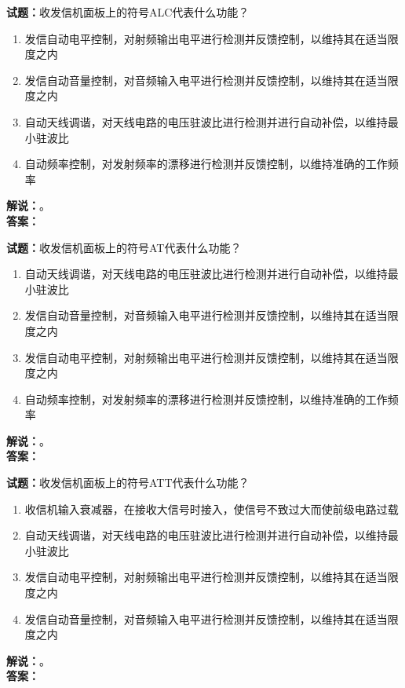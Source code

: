\documentclass{ctexbook}
\begin{document}
\bigskip




\noindent\textbf{试题：}收发信机面板上的符号ALC代表什么功能？
\begin{enumerate}[leftmargin=3em]
\item 发信自动电平控制，对射频输出电平进行检测并反馈控制，以维持其在适当限度之内
\item 发信自动音量控制，对音频输入电平进行检测并反馈控制，以维持其在适当限度之内
\item 自动天线调谐，对天线电路的电压驻波比进行检测并进行自动补偿，以维持最小驻波比
\item 自动频率控制，对发射频率的漂移进行检测并反馈控制，以维持准确的工作频率
\end{enumerate}
\noindent\textbf{解说：}\textbf{}。\\\noindent\textbf{答案：}

\bigskip




\noindent\textbf{试题：}收发信机面板上的符号AT代表什么功能？
\begin{enumerate}[leftmargin=3em]
\item 自动天线调谐，对天线电路的电压驻波比进行检测并进行自动补偿，以维持最小驻波比
\item 发信自动音量控制，对音频输入电平进行检测并反馈控制，以维持其在适当限度之内
\item 发信自动电平控制，对射频输出电平进行检测并反馈控制，以维持其在适当限度之内
\item 自动频率控制，对发射频率的漂移进行检测并反馈控制，以维持准确的工作频率
\end{enumerate}
\noindent\textbf{解说：}\textbf{}。\\\noindent\textbf{答案：}

\bigskip




\noindent\textbf{试题：}收发信机面板上的符号ATT代表什么功能？
\begin{enumerate}[leftmargin=3em]
\item 收信机输入衰减器，在接收大信号时接入，使信号不致过大而使前级电路过载
\item 自动天线调谐，对天线电路的电压驻波比进行检测并进行自动补偿，以维持最小驻波比
\item 发信自动电平控制，对射频输出电平进行检测并反馈控制，以维持其在适当限度之内
\item 发信自动音量控制，对音频输入电平进行检测并反馈控制，以维持其在适当限度之内
\end{enumerate}
\noindent\textbf{解说：}\textbf{}。\\\noindent\textbf{答案：}
\end{document}
